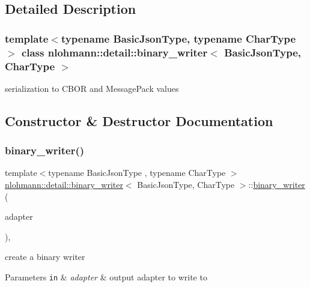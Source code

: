 \subsection{Detailed Description}
\subsubsection*{template$<$typename Basic\+Json\+Type, typename Char\+Type$>$\newline
class nlohmann\+::detail\+::binary\+\_\+writer$<$ Basic\+Json\+Type, Char\+Type $>$}

serialization to C\+B\+OR and Message\+Pack values 

\subsection{Constructor \& Destructor Documentation}
\mbox{\label{classnlohmann_1_1detail_1_1binary__writer_a373289af95a946c19bb4a58a5df71a78}} 
\subsubsection{\texorpdfstring{binary\+\_\+writer()}{binary\_writer()}}
{\footnotesize\ttfamily template$<$typename Basic\+Json\+Type , typename Char\+Type $>$ \\
\mbox{\hyperlink{classnlohmann_1_1detail_1_1binary__writer}{nlohmann\+::detail\+::binary\+\_\+writer}}$<$ Basic\+Json\+Type, Char\+Type $>$\+::\mbox{\hyperlink{classnlohmann_1_1detail_1_1binary__writer}{binary\+\_\+writer}} (\begin{DoxyParamCaption}\item[{\mbox{\hyperlink{namespacenlohmann_1_1detail_a9b680ddfb58f27eb53a67229447fc556}{output\+\_\+adapter\+\_\+t}}$<$ Char\+Type $>$}]{adapter }\end{DoxyParamCaption})\hspace{0.3cm}{\ttfamily [inline]}, {\ttfamily [explicit]}}



create a binary writer 


\begin{DoxyParams}[1]{Parameters}
\mbox{\tt in}  & {\em adapter} & output adapter to write to \\
\hline
\end{DoxyParams}


